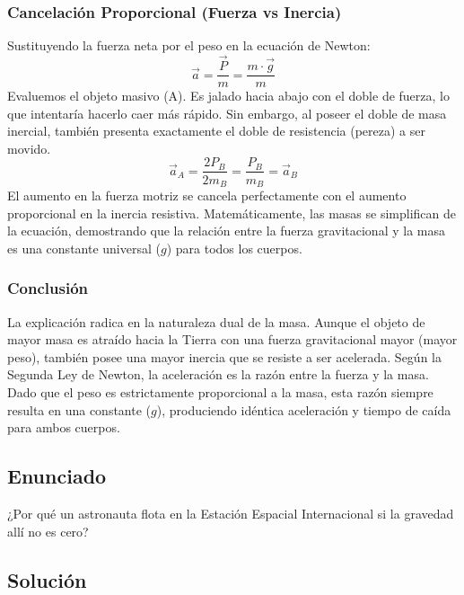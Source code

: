 \documentclass[12pt]{article}
\begin{document}
\subsubsection*{Cancelación Proporcional (Fuerza vs Inercia)}
Sustituyendo la fuerza neta por el peso en la ecuación de Newton:
\begin{equation}
    \vec{a} = \frac{\vec{P}}{m} = \frac{m \cdot \vec{g}}{m}
\end{equation}
Evaluemos el objeto masivo (A). Es jalado hacia abajo con el doble de fuerza, lo que intentaría hacerlo caer más rápido. Sin embargo, al poseer el doble de masa inercial, también presenta exactamente el doble de resistencia (pereza) a ser movido. 
\begin{equation}
    \vec{a}_A = \frac{2P_B}{2m_B} = \frac{P_B}{m_B} = \vec{a}_B
\end{equation}
El aumento en la fuerza motriz se cancela perfectamente con el aumento proporcional en la inercia resistiva. Matemáticamente, las masas se simplifican de la ecuación, demostrando que la relación entre la fuerza gravitacional y la masa es una constante universal ($g$) para todos los cuerpos.

\subsubsection*{Conclusión}
La explicación radica en la naturaleza dual de la masa. Aunque el objeto de mayor masa es atraído hacia la Tierra con una fuerza gravitacional mayor (mayor peso), también posee una mayor inercia que se resiste a ser acelerada. Según la Segunda Ley de Newton, la aceleración es la razón entre la fuerza y la masa. Dado que el peso es estrictamente proporcional a la masa, esta razón siempre resulta en una constante ($g$), produciendo idéntica aceleración y tiempo de caída para ambos cuerpos.

\newpage

\subsection*{Enunciado}
¿Por qué un astronauta flota en la Estación Espacial Internacional si la gravedad allí no es cero?

\subsection*{Solución}
\end{document}
